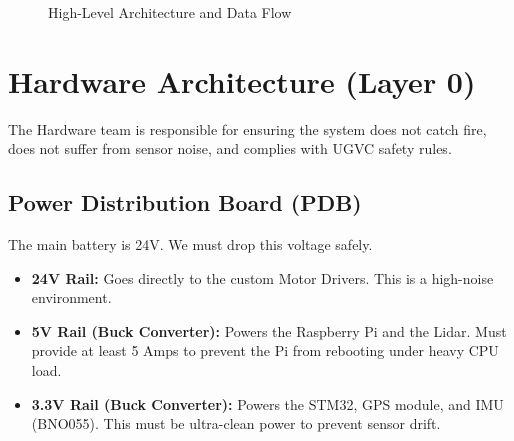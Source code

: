 \documentclass[12pt, a4paper]{article}
\begin{document}
\begin{figure}[H]
\centering
{}
\caption{High-Level Architecture and Data Flow}
\end{figure}

\newpage

\section{Hardware Architecture (Layer 0)}
The Hardware team is responsible for ensuring the system does not catch fire, does not suffer from sensor noise, and complies with UGVC safety rules.

\subsection{Power Distribution Board (PDB)}
The main battery is 24V. We must drop this voltage safely.
\begin{itemize}
    \item \textbf{24V Rail:} Goes directly to the custom Motor Drivers. This is a high-noise environment.
    \item \textbf{5V Rail (Buck Converter):} Powers the Raspberry Pi and the Lidar. Must provide at least 5 Amps to prevent the Pi from rebooting under heavy CPU load.
    \item \textbf{3.3V Rail (Buck Converter):} Powers the STM32, GPS module, and IMU (BNO055). This must be ultra-clean power to prevent sensor drift.
\end{itemize}
\end{document}
